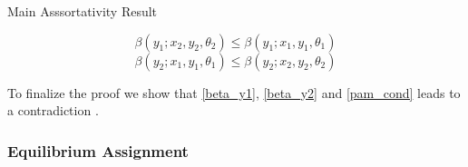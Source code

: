 \documentclass[notes,11pt, aspectratio=169]{beamer}
\newenvironment{wideitemize}{\itemize\addtolength{\itemsep}{10pt}}{\enditemize}
\begin{document}
\begin{frame}[label=main_result]{Main Asssortativity Result}
{\begin{wideitemize}
			\begin{equation}\label{beta_y1}
				\beta(y_1; x_2, y_2, \theta_2) \leq \beta(y_1; x_1, y_1, \theta_1) 
			\end{equation}
			\begin{equation}\label{beta_y2}
				\beta(y_2; x_1, y_1, \theta_1) \leq \beta(y_2; x_2, y_2, \theta_2) 
			\end{equation}
		\item To finalize the proof we show that \eqref{beta_y1}, \eqref{beta_y2} and \eqref{pam_cond} leads to a contradiction \hyperlink{appendix_proof_prop_2<2>}{}.
		\end{wideitemize}
	}
\end{frame}

\subsubsection{Equilibrium Assignment}
\end{document}
